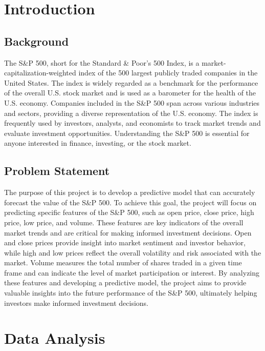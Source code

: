 \documentclass[final,5p,times,twocolumn,authoryear, 12pt]{elsarticle}
\begin{document}



\section{Introduction}
\label{introduction}

\subsection{Background}


The S\&P 500, short for the Standard \& Poor's 500 Index, is a market-capitalization-weighted index of the 500 largest publicly traded companies in the United States. The index is widely regarded as a benchmark for the performance of the overall U.S. stock market and is used as a barometer for the health of the U.S. economy. Companies included in the S\&P 500 span across various industries and sectors, providing a diverse representation of the U.S. economy. The index is frequently used by investors, analysts, and economists to track market trends and evaluate investment opportunities. Understanding the S\&P 500 is essential for anyone interested in finance, investing, or the stock market.

\subsection{Problem Statement}

The purpose of this project is to develop a predictive model that can accurately forecast the value of the S\&P 500. To achieve this goal, the project will focus on predicting specific features of the S\&P 500, such as open price, close price, high price, low price, and volume. These features are key indicators of the overall market trends and are critical for making informed investment decisions. Open and close prices provide insight into market sentiment and investor behavior, while high and low prices reflect the overall volatility and risk associated with the market. Volume measures the total number of shares traded in a given time frame and can indicate the level of market participation or interest. By analyzing these features and developing a predictive model, the project aims to provide valuable insights into the future performance of the S\&P 500, ultimately helping investors make informed investment decisions.

\section{Data Analysis}
\end{document}
